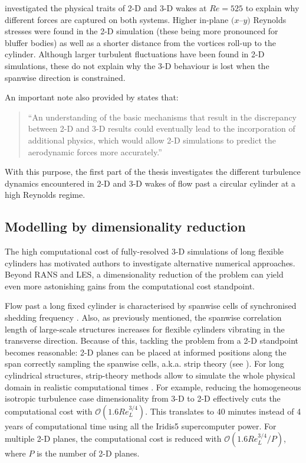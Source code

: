 \documentclass[../main.tex]{subfiles}
\begin{document}
\cite{Mittal1995} investigated the physical traits of 2-D and 3-D wakes at $Re=525$ to explain why different forces are captured on both systems.
Higher in-plane $(x$--$y)$ Reynolds stresses were found in the 2-D simulation (these being more pronounced for bluffer bodies) as well as a shorter distance from the vortices roll-up to the cylinder.
Although larger turbulent fluctuations have been found in 2-D simulations, these do not explain why the 3-D behaviour is lost when the spanwise direction is constrained.

An important note also provided by \cite{Mittal1995} states that:
\begin{quote}``An understanding of the basic mechanisms that result in the discrepancy between 2-D and 3-D results could eventually lead to the incorporation of additional physics, which would allow 2-D simulations to predict the aerodynamic forces more accurately.''
\end{quote}
With this purpose, the first part of the thesis investigates the different turbulence dynamics encountered in 2-D and 3-D wakes of flow past a circular cylinder at a high Reynolds regime.

\subsection{Modelling by dimensionality reduction} \label{sec:strip-theory}

The high computational cost of fully-resolved 3-D simulations of long flexible cylinders has motivated authors to investigate alternative numerical approaches.
Beyond RANS and LES, a dimensionality reduction of the problem can yield even more astonishing gains from the computational cost standpoint.

Flow past a long fixed cylinder is characterised by spanwise cells of synchronised shedding frequency \citep{Noack1991,Kappler2005,Bourguet2011}.
Also, as previously mentioned, the spanwise correlation length of large-scale structures increases for flexible cylinders vibrating in the transverse direction.
Because of this, tackling the problem from a 2-D standpoint becomes reasonable: 2-D planes can be placed at informed positions along the span correctly sampling the spanwise cells, a.k.a. strip theory (see ).
For long cylindrical structures, strip-theory methods allow to simulate the whole physical domain in realistic computational times \citep{Herfjord1999,Willden2001}.
For example, reducing the homogeneous isotropic turbulence case dimensionality from 3-D to 2-D effectively cuts the computational cost with $\mathcal{O}(1.6Re_L^{3/4})$.
This translates to 40 minutes instead of 4 years of computational time using all the Iridis5 supercomputer power.
For multiple 2-D planes, the computational cost is reduced with $\mathcal{O}(1.6Re_L^{3/4}/P)$, where $P$ is the number of 2-D planes.
\end{document}
